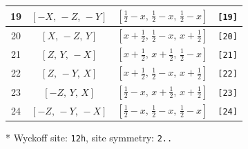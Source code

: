\documentclass[fleqn,8pt]{jsarticle}
\begin{document}
\begin{longtable}{cccc}
19 & $\left[ - X,\, - Z,\, - Y \right]$ & $\left[ \frac{1}{2} - x,\, \frac{1}{2} - x,\, \frac{1}{2} - x \right]$ & {\tt [19]} \\ \hline
20 & $\left[ X,\, - Z,\, Y \right]$ & $\left[ x + \frac{1}{2},\, \frac{1}{2} - x,\, x + \frac{1}{2} \right]$ & {\tt [20]} \\ \hline
21 & $\left[ Z,\, Y,\, - X \right]$ & $\left[ x + \frac{1}{2},\, x + \frac{1}{2},\, \frac{1}{2} - x \right]$ & {\tt [21]} \\ \hline
22 & $\left[ Z,\, - Y,\, X \right]$ & $\left[ x + \frac{1}{2},\, \frac{1}{2} - x,\, x + \frac{1}{2} \right]$ & {\tt [22]} \\ \hline
23 & $\left[ - Z,\, Y,\, X \right]$ & $\left[ \frac{1}{2} - x,\, x + \frac{1}{2},\, x + \frac{1}{2} \right]$ & {\tt [23]} \\ \hline
24 & $\left[ - Z,\, - Y,\, - X \right]$ & $\left[ \frac{1}{2} - x,\, \frac{1}{2} - x,\, \frac{1}{2} - x \right]$ & {\tt [24]} \\
\end{longtable}
* Wyckoff site: {\tt 12h}, site symmetry: {\tt 2..}
\renewcommand{\arraystretch}{1.2}
\end{document}
